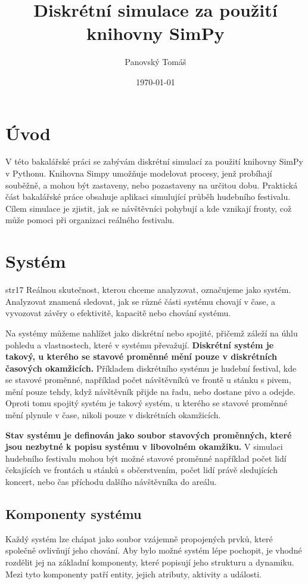 \documentclass[12pt,a4paper]{article}
\title{Diskrétní simulace za použití knihovny SimPy}
\author{Panovský Tomáš}
\date{\today}
\begin{document}
\maketitle

\section{Úvod}
V této bakalářské práci se zabývám diskrétní simulací za použití knihovny SimPy v Pythonu. 
Knihovna Simpy umožňuje modelovat procesy, jenž probíhají souběžně, a mohou být zastaveny, nebo pozastaveny na určitou dobu. Praktická část bakalářské práce obsahuje aplikaci simulující průběh hudebního festivalu.
Cílem simulace je zjistit, jak se návštěvníci pohybují a kde vznikají 
fronty, což může pomoci při organizaci reálného festivalu.

\section{Systém} str17
Reálnou skutečnost, kterou chceme analyzovat, označujeme jako systém. Analyzovat znamená sledovat, jak se různé části systému chovají v čase, a vyvozovat závěry o efektivitě, kapacitě nebo chování systému.

Na systémy můžeme nahlížet jako diskrétní nebo spojité, přičemž záleží na úhlu pohledu a vlastnostech, které v systému převažují. {\bf Diskrétní systém je takový, u kterého se stavové proměnné mění pouze v diskrétních časových okamžicích.} Příkladem diskrétního systému je hudební festival, kde se stavové proměnné, například počet návštěvníků ve frontě u stánku s pivem, mění pouze tehdy, když návštěvník přijde na řadu, nebo dostane pivo a odejde. Oproti tomu spojitý systém je takový systém, u kterého se stavové proměnné mění plynule v čase, nikoli pouze v diskrétních okamžicích.

{\bf Stav systému je definován jako soubor stavových proměnných, které jsou nezbytné k popisu systému v libovolném okamžiku.} V simulaci hudebního festivalu mohou být možné stavové proměnné například počet lidí čekajících ve frontách u stánků s občerstvením, počet lidí právě sledujících koncert, nebo čas příchodu dalšího návštěvníka do areálu.


\subsection{Komponenty systému}
Každý systém lze chápat jako soubor vzájemně propojených prvků, které společně ovlivňují jeho chování. Aby bylo možné systém lépe pochopit, je vhodné rozdělit jej na základní komponenty, které popisují jeho strukturu a dynamiku. Mezi tyto komponenty patří entity, jejich atributy, aktivity a události.
\end{document}
